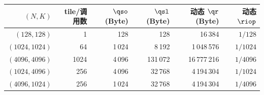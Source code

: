 \begin{tabular}{@{}rrrrrr@{}}\toprule
$(N,K)$ & tile/调用数 & $\qso$ (Byte) & $\qsl$ (Byte) & 动态 $\qr$ (Byte) & 动态 $\riop$\\\midrule
$(128,128)$ & 1 & 128 & 128 & 16\,384 & $1/128$ \\
$(1024,1024)$ & 64 & 1\,024 & 8\,192 & 1\,048\,576 & $1/1024$ \\
$(4096,4096)$ & 1024 & 4\,096 & 131\,072 & 16\,777\,216 & $1/4096$ \\
$(1024,4096)$ & 256 & 4\,096 & 32\,768 & 4\,194\,304 & $1/1024$ \\
$(4096,1024)$ & 256 & 1\,024 & 32\,768 & 4\,194\,304 & $1/4096$ \\
\bottomrule\end{tabular}
